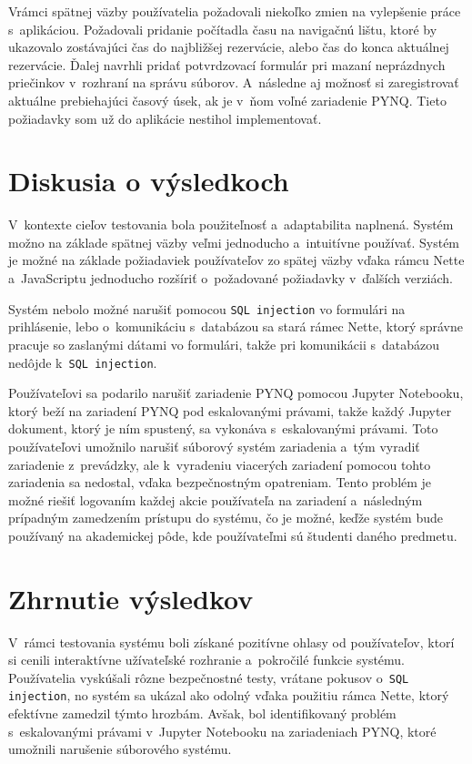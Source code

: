 Vrámci spätnej väzby používatelia požadovali niekoľko zmien na vylepšenie práce s~aplikáciou. Požadovali pridanie počítadla času na navigačnú lištu, ktoré by ukazovalo zostávajúci čas do najbližšej rezervácie, alebo čas do konca aktuálnej rezervácie. Ďalej navrhli pridať potvrdzovací formulár pri mazaní neprázdnych priečinkov v~rozhraní na správu súborov. A~následne aj možnosť si zaregistrovať aktuálne prebiehajúci časový úsek, ak je v~ňom voľné zariadenie PYNQ. Tieto požiadavky som už do aplikácie nestihol implementovať.

\section{Diskusia o výsledkoch}

V~kontexte cieľov testovania bola použiteľnosť a~adaptabilita naplnená. Systém možno na základe spätnej väzby veľmi jednoducho a~intuitívne používať. Systém je možné na základe požiadaviek používateľov zo spätej väzby vďaka rámcu Nette a~JavaScriptu jednoducho rozšíriť o~požadované požiadavky v~ďalších verziách. 

Systém nebolo možné narušiť pomocou \verb|SQL injection| vo formulári na prihlásenie, lebo o~komunikáciu s~databázou sa stará rámec Nette, ktorý správne pracuje so zaslanými dátami vo formulári, takže pri komunikácii s~databázou nedôjde k~\verb|SQL injection|.

Používateľovi sa podarilo narušiť zariadenie PYNQ pomocou Jupyter Notebooku, ktorý beží na zariadení PYNQ pod eskalovanými právami, takže každý Jupyter dokument, ktorý je ním spustený, sa vykonáva s~eskalovanými právami. Toto používateľovi umožnilo narušiť súborový systém zariadenia a~tým vyradiť zariadenie z~prevádzky, ale k~vyradeniu viacerých zariadení pomocou tohto zariadenia sa nedostal, vďaka bezpečnostným opatreniam. Tento problém je možné riešiť logovaním každej akcie používateľa na zariadení a~následným prípadným zamedzením prístupu do systému, čo je možné, keďže systém bude používaný na akademickej pôde, kde používateľmi sú študenti daného predmetu.

\section{Zhrnutie výsledkov}

V~rámci testovania systému boli získané pozitívne ohlasy od používateľov, ktorí si cenili interaktívne užívateľské rozhranie a~pokročilé funkcie systému. Používatelia vyskúšali rôzne bezpečnostné testy, vrátane pokusov o~\verb|SQL injection|, no systém sa ukázal ako odolný vďaka použitiu rámca Nette, ktorý efektívne zamedzil týmto hrozbám. Avšak, bol identifikovaný problém s~eskalovanými právami v~Jupyter Notebooku na zariadeniach PYNQ, ktoré umožnili narušenie súborového systému.

